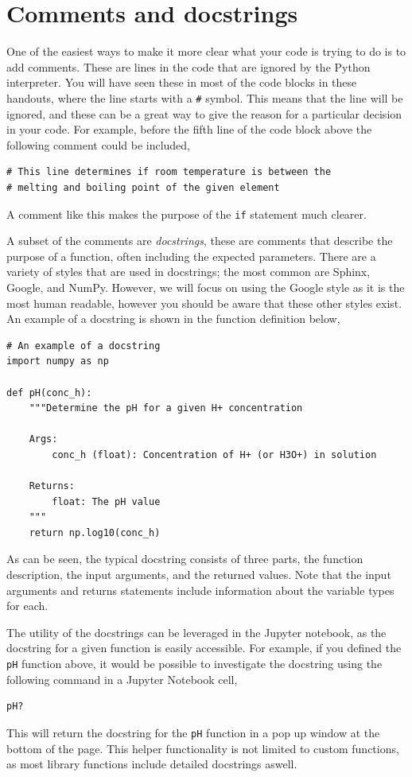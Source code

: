 \documentclass[a4paper]{article}
\begin{document}
\section{Comments and docstrings}
One of the easiest ways to make it more clear what your code is trying to do is to add comments.
These are lines in the code that are ignored by the Python interpreter.
You will have seen these in most of the code blocks in these handouts, where the line starts with a \texttt{\#} symbol.
This means that the line will be ignored, and these can be a great way to give the reason for a particular decision in your code.
For example, before the fifth line of the code block above the following comment could be included,
\begin{lstlisting}
# This line determines if room temperature is between the
# melting and boiling point of the given element
\end{lstlisting}
A comment like this makes the purpose of the \texttt{if} statement much clearer.

A subset of the comments are \emph{docstrings}, these are comments that describe the purpose of a function, often including the expected parameters.
There are a variety of styles that are used in docstrings; the most common are Sphinx, Google, and NumPy.
However, we will focus on using the Google style as it is the most human readable, however you should be aware that these other styles exist.
An example of a docstring is shown in the function definition below,
\begin{lstlisting}
# An example of a docstring
import numpy as np

def pH(conc_h):
    """Determine the pH for a given H+ concentration

    Args:
        conc_h (float): Concentration of H+ (or H3O+) in solution

    Returns:
        float: The pH value
    """
    return np.log10(conc_h)
\end{lstlisting}
As can be seen, the typical docstring consists of three parts, the function description, the input arguments, and the returned values.
Note that the input arguments and returns statements include information about the variable types for each.

The utility of the docstrings can be leveraged in the Jupyter notebook, as the docstring for a given function is easily accessible.
For example, if you defined the \texttt{pH} function above, it would be possible to investigate the docstring using the following command in a Jupyter Notebook cell,
\begin{lstlisting}
pH?
\end{lstlisting}
This will return the docstring for the \texttt{pH} function in a pop up window at the bottom of the page.
This helper functionality is not limited to custom functions, as most library functions include detailed docstrings aswell.
\end{document}
